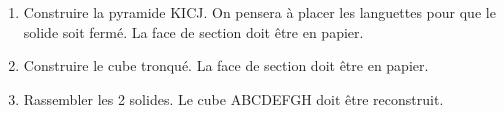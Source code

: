 \begin{enumerate}
\item Construire la pyramide KICJ. On pensera à placer les languettes pour que le solide soit fermé. La face de section doit être en papier. 
\item Construire le cube tronqué. La face de section doit être en papier. 
\item Rassembler les 2 solides. Le cube ABCDEFGH doit être reconstruit.
\end{enumerate}